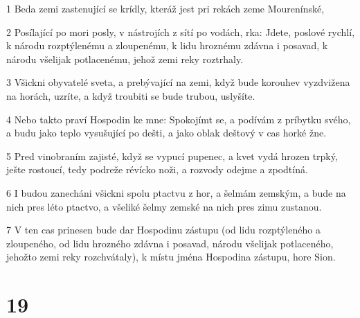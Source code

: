 \par 1 Beda zemi zastenující se krídly, kteráž jest pri rekách zeme Mourenínské,
\par 2 Posílající po mori posly, v nástrojích z sítí po vodách, rka: Jdete, poslové rychlí, k národu rozptýlenému a zloupenému, k lidu hroznému zdávna i posavad, k národu všelijak potlacenému, jehož zemi reky roztrhaly.
\par 3 Všickni obyvatelé sveta, a prebývající na zemi, když bude korouhev vyzdvižena na horách, uzríte, a když troubiti se bude trubou, uslyšíte.
\par 4 Nebo takto praví Hospodin ke mne: Spokojímt se, a podívám z príbytku svého, a budu jako teplo vysušující po dešti, a jako oblak deštový v cas horké žne.
\par 5 Pred vinobraním zajisté, když se vypucí pupenec, a kvet vydá hrozen trpký, ješte rostoucí, tedy podreže révícko noži, a rozvody odejme a zpodtíná.
\par 6 I budou zanecháni všickni spolu ptactvu z hor, a šelmám zemským, a bude na nich pres léto ptactvo, a všeliké šelmy zemské na nich pres zimu zustanou.
\par 7 V ten cas prinesen bude dar Hospodinu zástupu (od lidu rozptýleného a zloupeného, od lidu hrozného zdávna i posavad, národu všelijak potlaceného, jehožto zemi reky rozchvátaly), k místu jména Hospodina zástupu, hore Sion.

\chapter{19}

